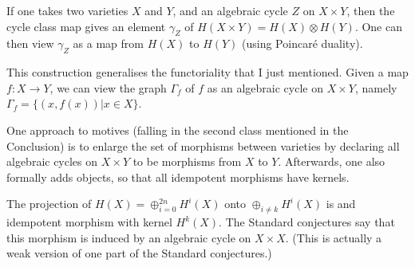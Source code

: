 \documentclass[a4paper,10pt]{article}
\begin{document}
If one takes two varieties $X$ and $Y$, and an algebraic cycle $Z$ on $X \times
Y$, then the cycle class map gives an element $\gamma_{Z}$ of $H(X \times Y) =
H(X) \otimes H(Y)$. One can then view $\gamma_{Z}$ as a map from $H(X)$ to
$H(Y)$ (using Poincar\'{e} duality).

This construction generalises the functoriality that I just mentioned. Given a
map $f \colon X \to Y$, we can view the graph $\Gamma_{f}$ of $f$ as an
algebraic cycle on $X \times Y$, namely $\Gamma_{f} = \{ (x,f(x)) | x \in X
\}$.

One approach to motives (falling in the second class mentioned in the
Conclusion) is to enlarge the set of morphisms between varieties by declaring
all algebraic cycles on $X \times Y$ to be morphisms from $X$ to $Y$.
Afterwards, one also formally adds objects, so that all idempotent morphisms
have kernels.

The projection of $H(X) = \oplus_{i = 0}^{2n} H^{i}(X)$ onto $\oplus_{i \ne k}
H^{i}(X)$ is and idempotent morphism with kernel $H^{k}(X)$. The Standard
conjectures say that this morphism is induced by an algebraic cycle on $X
\times X$. (This is actually a weak version of one part of the Standard
conjectures.)



\end{document}
